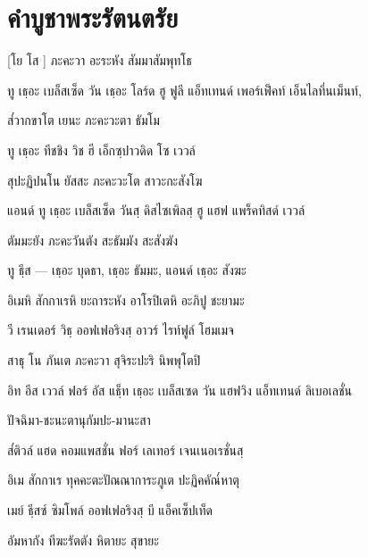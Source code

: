 \chapter{คําบูชาพระรัตนตรัย}

[โย โส ] ภะคะวา อะระหัง สัมมาสัมพุทโธ

\begin{english}
ทู เธฺอะ เบล็สเซ็ด   วัน เธฺอะ โลร์ด ฮู ฟูลี แอ็ทเทนด์ เพอร์เฟ็คท์ เอ็นไลทึ่นเม็นท์,
\end{english}

ส๎วากขาโต เยนะ ภะคะวะตา ธัมโม

\begin{english}
ทู เธฺอะ ทีชชิง วิช ฮี เอ็กซฺปาวดิด โซ เววล์
\end{english}

สุปะฏิปนโน  ยัสสะ ภะคะวะโต สาวะกะสังโฆ

\begin{english}
แอนด์ ทู เธฺอะ เบล็สเซ็ด  วันสฺ ดิสไซเพิลสฺ ฮู แฮฟ แพร็คทิสด์ เววล์
\end{english}

ตัมมะยัง ภะคะวันตัง สะธัมมัง สะสังฆัง

\begin{english}
ทู ธีฺส — เธฺอะ บุดธา, เธฺอะ ธัมมะ, แอนด์ เธฺอะ สังฆะ
\end{english}

อิเมหิ สักกาเรหิ ยะถาระหัง อาโรปิเตหิ อะภิปู ชะยามะ

\begin{english}
วี เรนเดอร์ วิธฺ ออฟเฟอริงสฺ อาวร์ ไรท์ฟูล์ โฮมเมจ
\end{english}

สาธุ โน ภันเต ภะคะวา สุจิระปะริ นิพพุโตปิ

\begin{english}
อิท อีส เววล์ ฟอร์ อัส แธฺ็ท เธฺอะ เบล็สเซด วัน แฮฟวิง แอ็ทเทนด์ ลิเบอเลชั่น
\end{english}

ปัจฉิมา-ชะนะตานุกัมปะ-มานะสา

\begin{english}
ส๎ติวล์ แฮด คอมแพสชั่น ฟอร์ เลเทอร์ เจนเนอเรชั่นสฺ
\end{english}

อิเม สักกาเร ทุคคะตะปัณณาการะภูเต ปะฏิคคัณ๎หาตุ

\begin{english}
เมย์ ธีฺสซ์ ซิมโพล์ ออฟเฟอริงสฺ บี แอ็คเซ็ปเท็ด
\end{english}

อัมหากัง ทีฆะรัตตัง หิตายะ สุขายะ

